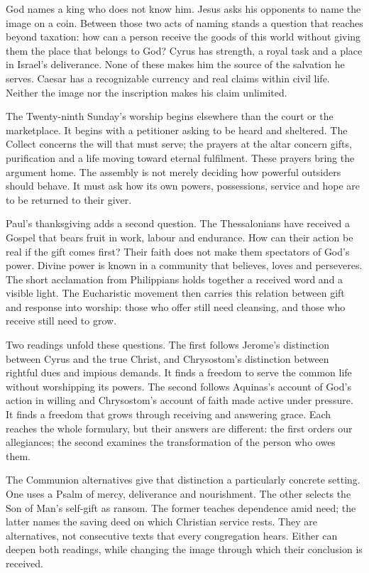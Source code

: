 God names a king who does not know him. Jesus asks his opponents to name the image on a coin. Between those two acts of naming stands a question that reaches beyond taxation: how can a person receive the goods of this world without giving them the place that belongs to God? Cyrus has strength, a royal task and a place in Israel's deliverance. None of these makes him the source of the salvation he serves. Caesar has a recognizable currency and real claims within civil life. Neither the image nor the inscription makes his claim unlimited.

The Twenty-ninth Sunday's worship begins elsewhere than the court or the marketplace. It begins with a petitioner asking to be heard and sheltered. The Collect concerns the will that must serve; the prayers at the altar concern gifts, purification and a life moving toward eternal fulfilment. These prayers bring the argument home. The assembly is not merely deciding how powerful outsiders should behave. It must ask how its own powers, possessions, service and hope are to be returned to their giver.

Paul's thanksgiving adds a second question. The Thessalonians have received a Gospel that bears fruit in work, labour and endurance. How can their action be real if the gift comes first? Their faith does not make them spectators of God's power. Divine power is known in a community that believes, loves and perseveres. The short acclamation from Philippians holds together a received word and a visible light. The Eucharistic movement then carries this relation between gift and response into worship: those who offer still need cleansing, and those who receive still need to grow.

Two readings unfold these questions. The first follows Jerome's distinction between Cyrus and the true Christ, and Chrysostom's distinction between rightful dues and impious demands. It finds a freedom to serve the common life without worshipping its powers. The second follows Aquinas's account of God's action in willing and Chrysostom's account of faith made active under pressure. It finds a freedom that grows through receiving and answering grace. Each reaches the whole formulary, but their answers are different: the first orders our allegiances; the second examines the transformation of the person who owes them.

The Communion alternatives give that distinction a particularly concrete setting. One uses a Psalm of mercy, deliverance and nourishment. The other selects the Son of Man's self-gift as ransom. The former teaches dependence amid need; the latter names the saving deed on which Christian service rests. They are alternatives, not consecutive texts that every congregation hears. Either can deepen both readings, while changing the image through which their conclusion is received.
